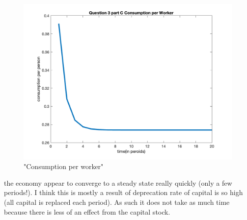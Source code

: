 \begin{enumerate}
     \begin{figure}[H]
        \centering
        \includegraphics[width =.75\linewidth]{HW2/pics/HW1_Q3_c_consumption.png}
        \caption{"Consumption per worker"}
    \end{figure}
\end{enumerate}

the economy appear to converge to a steady state really quickly (only a few periods!). I think this is mostly a result of deprecation rate of capital is so high (all capital is replaced each period). As such it does not take as much time because there is less of an effect from the capital stock.